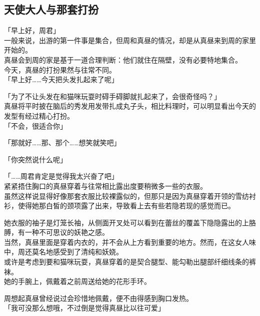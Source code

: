 \subsection{天使大人与那套打扮}

「早上好，周君」\\

一般来说，出游的第一件事是集合，但周和真昼的情况，却是从真昼来到周的家里开始的。\\

真昼会到周的家是基于一道合理判断：他们就住在隔壁，没有必要特地集合。\\

今天，真昼的打扮果然与往常不同。\\

「早上好……今天把头发扎起来了呢」

「为了不让头发在和猫咪玩耍时碍手碍脚就扎起来了，会很奇怪吗？」\\

真昼将平时披在脑后的秀发用发带扎成丸子头，相比料理时，可以明显看出今天的发型有经过精心打扮。\\

「不会，很适合你」

「那就好……那、那个……想笑就笑吧」

「你突然说什么呢」

「……周君肯定是觉得我太兴奋了吧」\\

紧紧捂住胸口的真昼穿着与往常相比露出度要稍微多一些的衣服。\\

虽然这样说显得好像那套衣服比较裸露似的，但那只是因为真昼穿着开领的雪纺衬衫，使得她那白皙的颈项露了出来，导致看上去有些若隐若现的感觉而已。

她衣服的袖子是灯笼长袖，从侧面开叉处可以看到在蕾丝的覆盖下隐隐露出的上胳膊，有一种不可思议的妖艳之感。\\

当然，真昼里面是穿着内衣的，并不会从上方看到重要的地方。然而，在这女人味中，周还莫名地感受到了清纯和妖娆。\\

或许是考虑到要和猫咪玩耍，真昼穿着的是契合腿型、能勾勒出腿部纤细线条的裤袜。\\

她的手腕上，佩戴着之前周送给她的花形手环。

周想起真昼曾经说过会珍惜地佩戴，便不由得感到胸口发热。\\

「我可没那么想哦，不过倒是觉得真昼比以往可爱」

